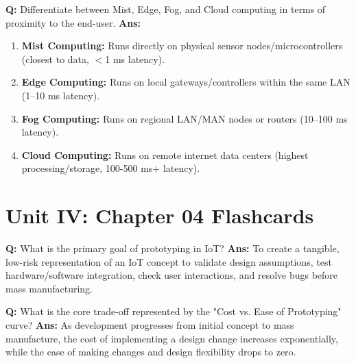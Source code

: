 \documentclass[10pt,a4paper,twocolumn]{article}
\begin{document}
\begin{tcolorbox}[
  colback=white,
  colframe=UnitColorThree,
  colbacktitle=gray!10!white,
  coltitle=black,
  fonttitle=\bfseries\sffamily\small,
  title={Unit III $\bullet$ Card 18},
  boxrule=1.2pt,
  arc=2mm,
  outer arc=2mm,
  boxsep=1.5mm,
  top=1mm,
  bottom=1mm,
  left=1.5mm,
  right=1.5mm,
  before skip=2.5mm,
  after skip=2.5mm
]
\textbf{Q:} Differentiate between Mist, Edge, Fog, and Cloud computing in terms of proximity to the end-user.
\tcbline
\textbf{Ans:} \begin{enumerate}
  \item \textbf{Mist Computing:} Runs directly on physical sensor nodes/microcontrollers (closest to data, $<$1 ms latency).
  \item \textbf{Edge Computing:} Runs on local gateways/controllers within the same LAN (1–10 ms latency).
  \item \textbf{Fog Computing:} Runs on regional LAN/MAN nodes or routers (10–100 ms latency).
  \item \textbf{Cloud Computing:} Runs on remote internet data centers (highest processing/storage, 100-500 ms+ latency).
\end{enumerate}
\end{tcolorbox}

\section*{Unit IV: Chapter 04 Flashcards}

\begin{tcolorbox}[
  colback=white,
  colframe=UnitColorFour,
  colbacktitle=gray!10!white,
  coltitle=black,
  fonttitle=\bfseries\sffamily\small,
  title={Unit IV $\bullet$ Card 1},
  boxrule=1.2pt,
  arc=2mm,
  outer arc=2mm,
  boxsep=1.5mm,
  top=1mm,
  bottom=1mm,
  left=1.5mm,
  right=1.5mm,
  before skip=2.5mm,
  after skip=2.5mm
]
\textbf{Q:} What is the primary goal of prototyping in IoT?
\tcbline
\textbf{Ans:} To create a tangible, low-risk representation of an IoT concept to validate design assumptions, test hardware/software integration, check user interactions, and resolve bugs before mass manufacturing.
\end{tcolorbox}


\begin{tcolorbox}[
  colback=white,
  colframe=UnitColorFour,
  colbacktitle=gray!10!white,
  coltitle=black,
  fonttitle=\bfseries\sffamily\small,
  title={Unit IV $\bullet$ Card 2},
  boxrule=1.2pt,
  arc=2mm,
  outer arc=2mm,
  boxsep=1.5mm,
  top=1mm,
  bottom=1mm,
  left=1.5mm,
  right=1.5mm,
  before skip=2.5mm,
  after skip=2.5mm
]
\textbf{Q:} What is the core trade-off represented by the "Cost vs. Ease of Prototyping" curve?
\tcbline
\textbf{Ans:} As development progresses from initial concept to mass manufacture, the cost of implementing a design change increases exponentially, while the ease of making changes and design flexibility drops to zero.
\end{tcolorbox}
\end{document}

